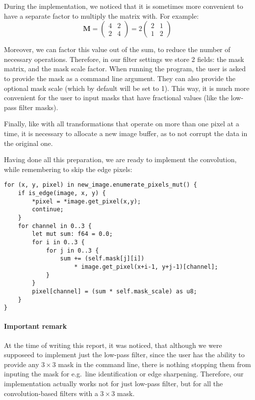 \documentclass[12pt]{article}
\begin{document}
During the implementation, we noticed that it is sometimes more convenient
to have a separate factor to multiply the matrix with.
For example:
\[
    \mathbf{M} = \begin{pmatrix}
        4 & 2 \\ 2 & 4
    \end{pmatrix} = 2 \begin{pmatrix}
        2 & 1 \\ 1 & 2
    \end{pmatrix}
\]

Moreover, we can factor this value out of the sum, to reduce the number of necessary operations.
Therefore, in our filter settings we store 2 fields: the mask matrix, and the mask scale factor.
When running the program, the user is asked to provide the mask as a command line argument.
They can also provide the optional mask scale (which by default will be set to 1).
This way, it is much more convenient for the user to input masks that have fractional values (like the low-pass filter masks).

Finally, like with all transformations that operate on more than one pixel at a time,
it is necessary to allocate a new image buffer, as to not corrupt the data in the original one.

Having done all this preparation, we are ready to implement the convolution, while remembering to skip the edge pixels:

\pagebreak[3]
\begin{lstlisting}
for (x, y, pixel) in new_image.enumerate_pixels_mut() {
    if is_edge(image, x, y) {
        *pixel = *image.get_pixel(x,y);
        continue;
    }
    for channel in 0..3 {
        let mut sum: f64 = 0.0;
        for i in 0..3 {
            for j in 0..3 {
                sum += (self.mask[j][i])
                    * image.get_pixel(x+i-1, y+j-1)[channel];
            }
        }
        pixel[channel] = (sum * self.mask_scale) as u8;
    }
}
\end{lstlisting}

\paragraph{Important remark}
At the time of writing this report, it was noticed, that although we were supposeed to implement just the low-pass filter,
since the user has the ability to provide any $3\times3$ mask in the command line,
there is nothing stopping them from inputing the mask for e.g.\ line identification or edge sharpening.
Therefore, our implementation actually works not for just low-pass filter, but for all the convolution-based filters with a $3\times3$ mask.
\end{document}
